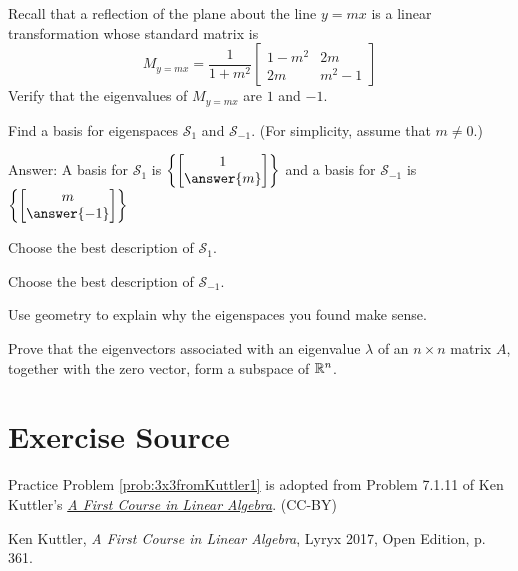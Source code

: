 \documentclass{ximera}
\begin{document}
\begin{problem}\label{prob:eigvectorstransfr2_3}
Recall that a reflection of the plane about the line $y=mx$ is a linear transformation whose standard matrix is
$$M_{y=mx}=\frac{1}{1+m^2}\begin{bmatrix}
1-m^2 & 2m \\
2m & m^2-1
\end{bmatrix}$$
Verify that the eigenvalues of $M_{y=mx}$ are
$1$ and $-1$.

Find a basis for eigenspaces $\mathcal{S}_{1}$ and $\mathcal{S}_{-1}$.  (For simplicity, assume that $m\neq 0$.)

Answer:  A basis for $\mathcal{S}_{1}$ is $\left\{\begin{bmatrix}1\\\answer{m}\end{bmatrix}\right\}$
and a basis for $\mathcal{S}_{-1}$ is $\left\{\begin{bmatrix}m\\\answer{-1}\end{bmatrix}\right\}$

Choose the best description of $\mathcal{S}_{1}$.
\begin{multipleChoice}
\end{multipleChoice}

Choose the best description of $\mathcal{S}_{-1}$.
\begin{multipleChoice}
\end{multipleChoice}

Use geometry to explain why the eigenspaces you found make sense.

\end{problem}

\begin{problem}\label{prob:eigenspace1}
Prove that the eigenvectors associated with an eigenvalue $\lambda$ of an $n \times n$ matrix $A$, together with the zero vector, form a subspace of $\mathbb{R}^n$. 
\end{problem}

\section*{Exercise Source}
Practice Problem \ref{prob:3x3fromKuttler1} is adopted from Problem 7.1.11 of Ken Kuttler's \href{https://open.umn.edu/opentextbooks/textbooks/a-first-course-in-linear-algebra-2017}{\it A First Course in Linear Algebra}. (CC-BY)

Ken Kuttler, {\it  A First Course in Linear Algebra}, Lyryx 2017, Open Edition, p. 361.
\end{document}
